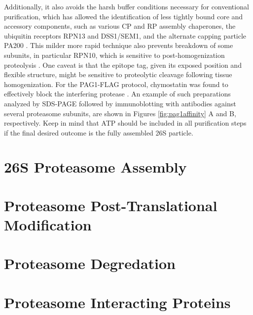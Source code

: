 Additionally, it also avoids the harsh buffer conditions necessary for conventional purification, which has allowed the identification of less tightly bound core and accessory components, such as various CP and RP assembly chaperones, the ubiquitin receptors RPN13 and DSS1/SEM1, and the alternate capping particle PA200 \citep{book10, russell13}.  This milder more rapid technique also prevents breakdown of some subunits, in particular RPN10, which is sensitive to post-homogenization proteolysis \citep{yang04}.  One caveat is that the epitope tag, given its exposed position and flexible structure, might be sensitive to proteolytic cleavage following tissue homogenization.  For the PAG1-FLAG protocol, chymostatin was found to effectively block the interfering protease \citep{book10}.  An example of such preparations analyzed by SDS-PAGE followed by immunoblotting with antibodies against several proteasome subunits, are shown in Figures  \ref{fig:pag1affinity} A and B, respectively. Keep in mind that ATP should be included in all purification steps if the final desired outcome is the fully assembled 26S particle.
\section{26S Proteasome Assembly}
\section{Proteasome Post-Translational Modification}
\section{Proteasome Degredation}
\section{Proteasome Interacting Proteins}



